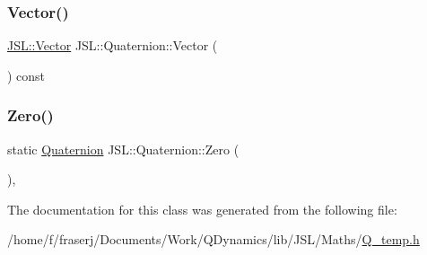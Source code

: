 \mbox{\label{classJSL_1_1Quaternion_a0255f2026ec4af9cff42d09d2309af01}} 
\subsubsection{\texorpdfstring{Vector()}{Vector()}\hspace{0.1cm}{\footnotesize\ttfamily [3/3]}}
{\footnotesize\ttfamily \hyperlink{classJSL_1_1Vector}{J\+S\+L\+::\+Vector} J\+S\+L\+::\+Quaternion\+::\+Vector (\begin{DoxyParamCaption}{ }\end{DoxyParamCaption}) const\hspace{0.3cm}{\ttfamily [inline]}}

\mbox{\label{classJSL_1_1Quaternion_a63e84edb5230efc8378d86b5d182221d}} 
\subsubsection{\texorpdfstring{Zero()}{Zero()}}
{\footnotesize\ttfamily static \hyperlink{classJSL_1_1Quaternion}{Quaternion} J\+S\+L\+::\+Quaternion\+::\+Zero (\begin{DoxyParamCaption}{ }\end{DoxyParamCaption})\hspace{0.3cm}{\ttfamily [inline]}, {\ttfamily [static]}}



The documentation for this class was generated from the following file\+:\begin{DoxyCompactItemize}
\item 
/home/f/fraserj/\+Documents/\+Work/\+Q\+Dynamics/lib/\+J\+S\+L/\+Maths/\hyperlink{Q__temp_8h}{Q\+\_\+temp.\+h}\end{DoxyCompactItemize}
